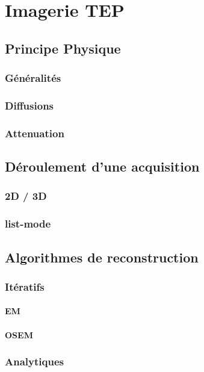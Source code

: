 \documentclass[12pt]{book}
\begin{document}
\part{Imagerie TEP}
	\chapter{Principe Physique}
		\section{Généralités}
		\section{Diffusions}
		\section{Attenuation}

	\chapter{Déroulement d'une acquisition}
		\section{2D / 3D}
		\section{list-mode}

	\chapter{Algorithmes de reconstruction}
		\section{Itératifs}
			\subsection{EM}
			\subsection{OSEM}
		\section{Analytiques}
			
\end{document}
